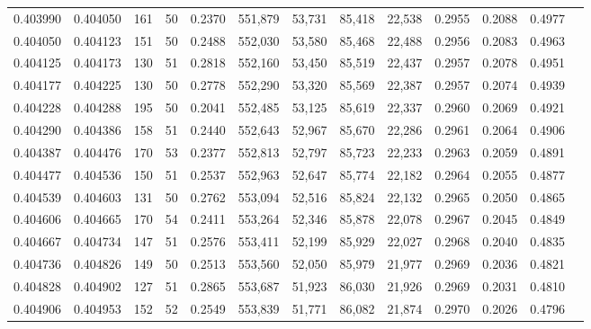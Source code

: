 \begin{tabular}{rrrrrrrrrrrrr}
0.403990 & 0.404050 &   161 &  50 &                                     0.2370 & 551,879 &  53,731 &  85,418 &  22,538 & 0.2955 & 0.2088 & 0.4977 \\
0.404050 & 0.404123 &   151 &  50 &                                     0.2488 & 552,030 &  53,580 &  85,468 &  22,488 & 0.2956 & 0.2083 & 0.4963 \\
0.404125 & 0.404173 &   130 &  51 &                                     0.2818 & 552,160 &  53,450 &  85,519 &  22,437 & 0.2957 & 0.2078 & 0.4951 \\
0.404177 & 0.404225 &   130 &  50 &                                     0.2778 & 552,290 &  53,320 &  85,569 &  22,387 & 0.2957 & 0.2074 & 0.4939 \\
0.404228 & 0.404288 &   195 &  50 &                                     0.2041 & 552,485 &  53,125 &  85,619 &  22,337 & 0.2960 & 0.2069 & 0.4921 \\
0.404290 & 0.404386 &   158 &  51 &                                     0.2440 & 552,643 &  52,967 &  85,670 &  22,286 & 0.2961 & 0.2064 & 0.4906 \\
0.404387 & 0.404476 &   170 &  53 &                                     0.2377 & 552,813 &  52,797 &  85,723 &  22,233 & 0.2963 & 0.2059 & 0.4891 \\
0.404477 & 0.404536 &   150 &  51 &                                     0.2537 & 552,963 &  52,647 &  85,774 &  22,182 & 0.2964 & 0.2055 & 0.4877 \\
0.404539 & 0.404603 &   131 &  50 &                                     0.2762 & 553,094 &  52,516 &  85,824 &  22,132 & 0.2965 & 0.2050 & 0.4865 \\
0.404606 & 0.404665 &   170 &  54 &                                     0.2411 & 553,264 &  52,346 &  85,878 &  22,078 & 0.2967 & 0.2045 & 0.4849 \\
0.404667 & 0.404734 &   147 &  51 &                                     0.2576 & 553,411 &  52,199 &  85,929 &  22,027 & 0.2968 & 0.2040 & 0.4835 \\
0.404736 & 0.404826 &   149 &  50 &                                     0.2513 & 553,560 &  52,050 &  85,979 &  21,977 & 0.2969 & 0.2036 & 0.4821 \\
0.404828 & 0.404902 &   127 &  51 &                                     0.2865 & 553,687 &  51,923 &  86,030 &  21,926 & 0.2969 & 0.2031 & 0.4810 \\
0.404906 & 0.404953 &   152 &  52 &                                     0.2549 & 553,839 &  51,771 &  86,082 &  21,874 & 0.2970 & 0.2026 & 0.4796 \\

\end{tabular}
